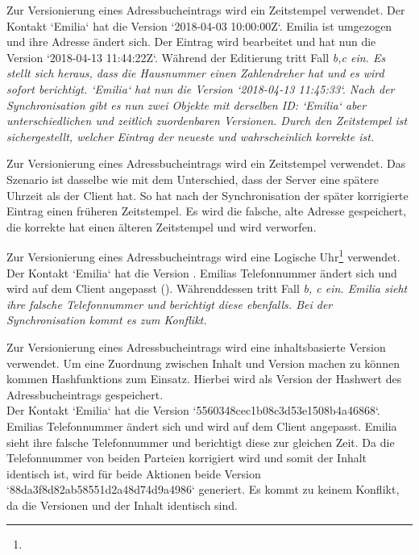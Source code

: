 \begin{description}[leftmargin=0.5cm,style=nextline]
  \item[Szenario V1:]%
  Zur Versionierung eines Adressbucheintrags wird ein Zeitstempel verwendet. Der Kontakt `Emilia` hat die Version `2018-04-03 10:00:00Z`. Emilia ist umgezogen und ihre Adresse ändert sich. Der Eintrag wird bearbeitet und hat nun die Version `2018-04-13 11:44:22Z`. Während der Editierung tritt Fall \it{b,c} ein. Es stellt sich heraus, dass die Hausnummer einen Zahlendreher hat und es wird sofort berichtigt. `Emilia` hat nun die Version `2018-04-13 11:45:33`. Nach der Synchronisation gibt es nun zwei Objekte mit derselben ID: `Emilia` aber unterschiedlichen und zeitlich zuordenbaren Versionen. Durch den Zeitstempel ist sichergestellt, welcher Eintrag der neueste und wahrscheinlich korrekte ist.\\
  \item[Szenario V2:]%
  Zur Versionierung eines Adressbucheintrags wird ein Zeitstempel verwendet. Das Szenario ist dasselbe wie  mit dem Unterschied, dass der Server eine spätere Uhrzeit als der Client hat. So hat nach der Synchronisation der später korrigierte Eintrag einen früheren Zeitstempel. Es wird die falsche, alte Adresse gespeichert, die korrekte hat einen älteren Zeitstempel und wird verworfen.\\
  \item[Szenario V3:]%
  Zur Versionierung eines Adressbucheintrags wird eine Logische Uhr\footnote{\logicalclock} verwendet. Der Kontakt `Emilia` hat die Version . Emilias Telefonnummer ändert sich und wird auf dem Client angepasst (). Währenddessen tritt Fall \it{b, c} ein. Emilia sieht ihre falsche Telefonnummer und berichtigt diese ebenfalls.  Bei der Synchronisation kommt es zum Konflikt. \\
  \item[Szenario V4:]%
  Zur Versionierung eines Adressbucheintrags wird eine inhaltsbasierte Version verwendet. Um eine Zuordnung zwischen Inhalt und Version machen zu können kommen \Glspl{Hashfunktion} zum Einsatz. Hierbei wird als Version der Hashwert des Adressbucheintrags gespeichert.\\
  Der Kontakt `Emilia` hat die Version `5560348cec1b08c3d53e1508b4a46868`. Emilias Telefonnummer ändert sich und wird auf dem Client angepasst. Emilia sieht ihre falsche Telefonnummer und berichtigt diese zur gleichen Zeit. Da die Telefonnummer von beiden Parteien korrigiert wird und somit der Inhalt identisch ist, wird für beide Aktionen beide Version `88da3f8d82ab58551d2a48d74d9a4986` generiert. Es kommt zu keinem Konflikt, da die Versionen und der Inhalt identisch sind.\\

\end{description}

